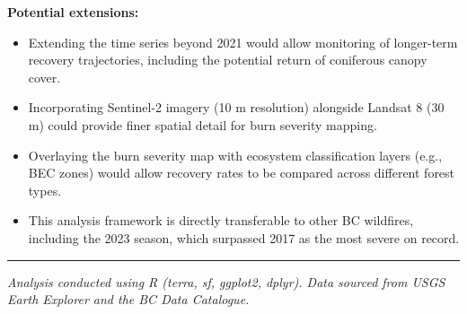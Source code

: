 \documentclass[
]{article}
\providecommand{\tightlist}{%
  \setlength{\itemsep}{0pt}\setlength{\parskip}{0pt}}
\begin{document}
\textbf{Potential extensions:}

\begin{itemize}
\tightlist
\item
  Extending the time series beyond 2021 would allow monitoring of
  longer-term recovery trajectories, including the potential return of
  coniferous canopy cover.
\item
  Incorporating Sentinel-2 imagery (10 m resolution) alongside Landsat 8
  (30 m) could provide finer spatial detail for burn severity mapping.
\item
  Overlaying the burn severity map with ecosystem classification layers
  (e.g., BEC zones) would allow recovery rates to be compared across
  different forest types.
\item
  This analysis framework is directly transferable to other BC
  wildfires, including the 2023 season, which surpassed 2017 as the most
  severe on record.
\end{itemize}

\begin{center}\rule{0.5\linewidth}{0.5pt}\end{center}

\emph{Analysis conducted using R (terra, sf, ggplot2, dplyr). Data
sourced from USGS Earth Explorer and the BC Data Catalogue.}
\end{document}
